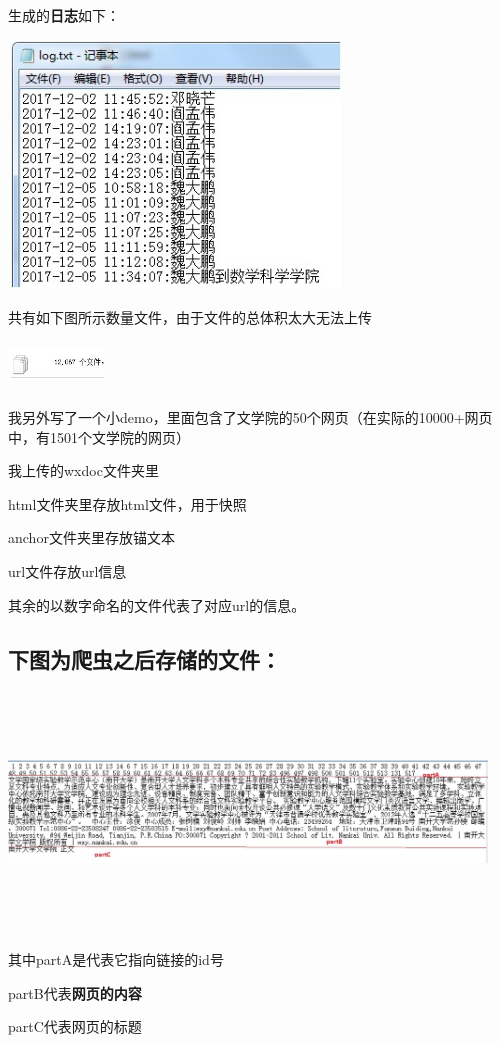﻿\documentclass[UTF8]{ctexart}
\begin{document}
\begin{flushleft}
\par{}
\par{}
生成的\textbf{日志}如下：
\par{}
\includegraphics[width=3.50in,height=2.60in]{figure14.jpg}
\par{}
共有如下图所示数量文件，由于文件的总体积太大无法上传
\par{}
\includegraphics[width=1.00in,height=0.50in]{figure32.jpg}
\par{}
我另外写了一个小demo，里面包含了文学院的50个网页（在实际的10000+网页中，有1501个文学院的网页）
\par{}
我上传的wxdoc文件夹里
\par{}
html文件夹里存放html文件，用于快照\par{}anchor文件夹里存放锚文本\par{}url文件存放url信息\par{}其余的以数字命名的文件代表了对应url的信息。
\subsection{下图为爬虫之后存储的文件：}
\par{}
\includegraphics[width=5.00in,height=2.50in]{figure6.jpg}
\par{}
其中partA是代表它指向链接的id号
\par{}
partB代表\textbf{网页的内容}
\par{}
partC代表网页的标题
\par{}

\end{flushleft}
\end{document}
